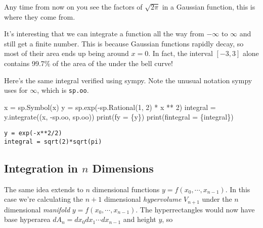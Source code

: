 \documentclass[
  letterpaper,
  DIV=11,
  numbers=noendperiod]{scrreprt}
\newenvironment{Shaded}{\begin{snugshade}}{\end{snugshade}}
\newcommand{\BuiltInTok}[1]{\textcolor[rgb]{0.00,0.23,0.31}{#1}}
\newcommand{\DecValTok}[1]{\textcolor[rgb]{0.68,0.00,0.00}{#1}}
\newcommand{\NormalTok}[1]{\textcolor[rgb]{0.00,0.23,0.31}{#1}}
\newcommand{\OperatorTok}[1]{\textcolor[rgb]{0.37,0.37,0.37}{#1}}
\newcommand{\SpecialCharTok}[1]{\textcolor[rgb]{0.37,0.37,0.37}{#1}}
\newcommand{\SpecialStringTok}[1]{\textcolor[rgb]{0.13,0.47,0.30}{#1}}
\newcommand{\StringTok}[1]{\textcolor[rgb]{0.13,0.47,0.30}{#1}}
\begin{document}
Any time from now on you see the factors of \(\sqrt{2\pi}\) in a
Gaussian function, this is where they come from.

It's interesting that we can integrate a function all the way from
\(-\infty\) to \(\infty\) and still get a finite number. This is because
Gaussian functions rapidly decay, so most of their area ends up being
around \(x=0\). In fact, the interval \([-3,3]\) alone contains 99.7\%
of the area of the under the bell curve!

Here's the same integral verified using sympy. Note the unusual notation
sympy uses for \(\infty\), which is \texttt{sp.oo}.

\begin{Shaded}
\begin{Highlighting}[]
\NormalTok{x }\OperatorTok{=}\NormalTok{ sp.Symbol(}\StringTok{\textquotesingle{}x\textquotesingle{}}\NormalTok{) }
\NormalTok{y }\OperatorTok{=}\NormalTok{ sp.exp(}\OperatorTok{{-}}\NormalTok{sp.Rational(}\DecValTok{1}\NormalTok{, }\DecValTok{2}\NormalTok{) }\OperatorTok{*}\NormalTok{ x }\OperatorTok{**} \DecValTok{2}\NormalTok{)}
\NormalTok{integral }\OperatorTok{=}\NormalTok{ y.integrate((x, }\OperatorTok{{-}}\NormalTok{sp.oo, sp.oo))}
\BuiltInTok{print}\NormalTok{(}\SpecialStringTok{f\textquotesingle{}y = }\SpecialCharTok{\{}\NormalTok{y}\SpecialCharTok{\}}\SpecialStringTok{\textquotesingle{}}\NormalTok{)}
\BuiltInTok{print}\NormalTok{(}\SpecialStringTok{f\textquotesingle{}integral = }\SpecialCharTok{\{}\NormalTok{integral}\SpecialCharTok{\}}\SpecialStringTok{\textquotesingle{}}\NormalTok{)}
\end{Highlighting}
\end{Shaded}

\begin{verbatim}
y = exp(-x**2/2)
integral = sqrt(2)*sqrt(pi)
\end{verbatim}

\hypertarget{integration-in-n-dimensions}{%
\subsection{\texorpdfstring{Integration in \(n\)
Dimensions}{Integration in n Dimensions}}\label{integration-in-n-dimensions}}

The same idea extends to \(n\) dimensional functions
\(y=f(x_0,\cdots,x_{n-1})\). In this case we're calculating the \(n+1\)
dimensional \emph{hypervolume} \(V_{n+1}\) under the \(n\) dimensional
\emph{manifold} \(y=f(x_0,\cdots,x_{n-1})\). The hyperrectangles would
now have base hyperarea \(dA_n = dx_0dx_1\cdots dx_{n-1}\) and height
\(y\), so
\end{document}
